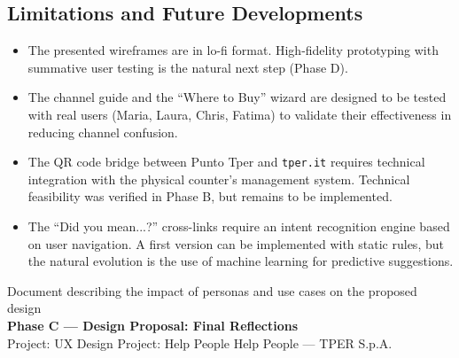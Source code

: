 \subsection{Limitations and Future Developments}

\begin{itemize}
    \item The presented wireframes are in lo-fi format. High-fidelity prototyping with summative user testing is the natural next step (Phase D).
    \item The channel guide and the ``Where to Buy'' wizard are designed to be tested with real users (Maria, Laura, Chris, Fatima) to validate their effectiveness in reducing channel confusion.
    \item The QR code bridge between Punto Tper and \texttt{tper.it} requires technical integration with the physical counter's management system. Technical feasibility was verified in Phase B, but remains to be implemented.
    \item The ``Did you mean...?'' cross-links require an intent recognition engine based on user navigation. A first version can be implemented with static rules, but the natural evolution is the use of machine learning for predictive suggestions.
\end{itemize}

\vspace{0.5cm}

\begin{center}
{\color{secondaryColor}\small
Document describing the impact of personas and use cases on the proposed design \\[4pt]
\textbf{Phase C --- Design Proposal: Final Reflections} \\[4pt]
Project: UX Design Project: Help People Help People --- TPER S.p.A.}
\end{center}
